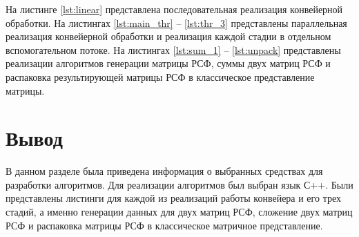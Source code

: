 На листинге \ref{lst:linear} представлена последовательная реализация конвейерной обработки.
На листингах \ref{lst:main_thr} -- \ref{lst:thr_3} представлены параллельная реализация конвейерной обработки и реализация каждой стадии в отдельном вспомогательном потоке.
На листингах \ref{lst:sum_1} -- \ref{lst:unpack} представлены реализации алгоритмов генерации матрицы РСФ, суммы двух матриц РСФ и распаковка результирующей матрицы РСФ в классическое представление матрицы.



\clearpage


\clearpage





\clearpage







\clearpage



\clearpage



\section*{Вывод}

В данном разделе была приведена информация о выбранных средствах для разработки алгоритмов. 
Для реализации алгоритмов был выбран язык С++.
Были представлены листинги для каждой из реализаций работы конвейера и его трех стадий, а именно генерации данных для двух матриц РСФ, сложение двух матриц РСФ и распаковка матрицы РСФ в классическое матричное представление.